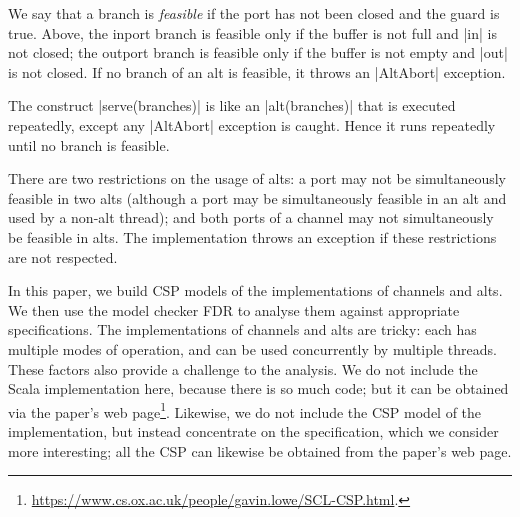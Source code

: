 We say that a branch is \emph{feasible} if the port has not been closed and
the guard is true.  Above, the inport branch is feasible only if the buffer is
not full and |in| is not closed; the outport branch is feasible only if the
buffer is not empty and |out| is not closed.  If no branch of an alt is
feasible, it throws an |AltAbort| exception.

The construct |serve(branches)| is like an |alt(branches)| that is executed
repeatedly, except any |AltAbort| exception is caught.  Hence it runs
repeatedly until no branch is feasible. 

There are two restrictions on the usage of alts: a port may not be
simultaneously feasible in two alts (although a port may be simultaneously
feasible in an alt and used by a non-alt thread); and both ports of a channel
may not simultaneously be feasible in alts.  The implementation throws an
exception if these restrictions are not respected.

In this paper, we build CSP models of the implementations of channels and
alts.  We then use the model checker FDR to analyse them against appropriate
specifications. 
%
The implementations of channels and alts are tricky: each has multiple modes
of operation, and can be used concurrently by multiple threads.  These factors
also provide a challenge to the analysis.
%
We do not include the Scala implementation here, because there is so much
code; but it can be obtained via the paper's web
page\footnote{\url{https://www.cs.ox.ac.uk/people/gavin.lowe/SCL-CSP.html}.}. 
Likewise, we do not include the CSP model of the implementation, but instead
concentrate on the specification, which we consider more interesting; all the
CSP can likewise be obtained from the paper's web page.

